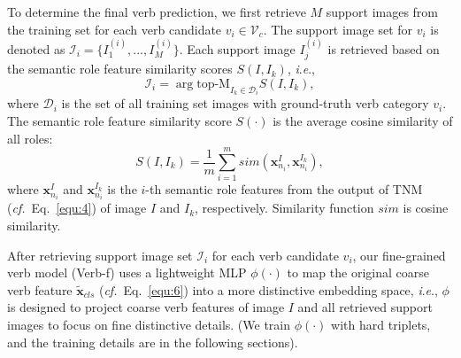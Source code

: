 \documentclass[letterpaper]{article} \usepackage{aaai22}  \usepackage{times}  \usepackage{helvet}  \usepackage{courier}  \usepackage[hyphens]{url}  \usepackage{graphicx} \urlstyle{rm} \def\UrlFont{\rm}  \usepackage{natbib}  \usepackage{caption} \DeclareCaptionStyle{ruled}{labelfont=normalfont,labelsep=colon,strut=off} \frenchspacing  \setlength{\pdfpagewidth}{8.5in}  \setlength{\pdfpageheight}{11in}
\newcommand{\ie}{\textit{i}.\textit{e}.}
\newcommand{\cf}{\textit{cf.}}
\begin{document}
To determine the final verb prediction, we first retrieve $M$ support images from the training set for each verb candidate $v_i \in \mathcal{V}_c$. The support image set for $v_i$ is denoted as $\mathcal{I}_i = \{I^{(i)}_1, ..., I^{(i)}_M \}$. Each support image $I^{(i)}_j$ is retrieved based on the semantic role feature similarity scores $S(I, I_k)$, \ie,
\begin{equation}
\mathcal{I}_i = \arg\text{top-M}_{I_k \in \mathcal{D}_i} S(I, I_k),
\end{equation}
where $\mathcal{D}_i$ is the set of all training set images with ground-truth verb category $v_i$. The semantic role feature similarity score $S(\cdot)$ is the average cosine similarity of all roles:
\begin{equation}
    S(I, I_k) = \frac{1}{m} \sum_{i=1}^{m} sim(\bm{x}_{n_i}^{I},\bm{x}_{n_i}^{I_k}),
\end{equation}
where $\bm{x}_{n_i}^{I}$ and $\bm{x}_{n_i}^{I_k}$ is the $i$-th semantic role features from the output of TNM (\cf~Eq.~\eqref{equ:4}) of image $I$ and $I_k$, respectively. Similarity function $sim$ is cosine similarity.





After retrieving support image set $\mathcal{I}_i$ for each verb candidate $v_i$, our fine-grained verb model (Verb-f) uses a lightweight MLP $\phi(\cdot)$ to map the original coarse verb feature $\tilde{\bm{x}}_{cls}$ (\cf~Eq.~\eqref{equ:6}) into a more distinctive embedding space, \ie, $\phi$ is designed to project coarse verb features of image $I$ and all retrieved support images to focus on fine distinctive details. (We train $\phi(\cdot)$ with hard triplets, and the training details are in the following sections).
\end{document}
